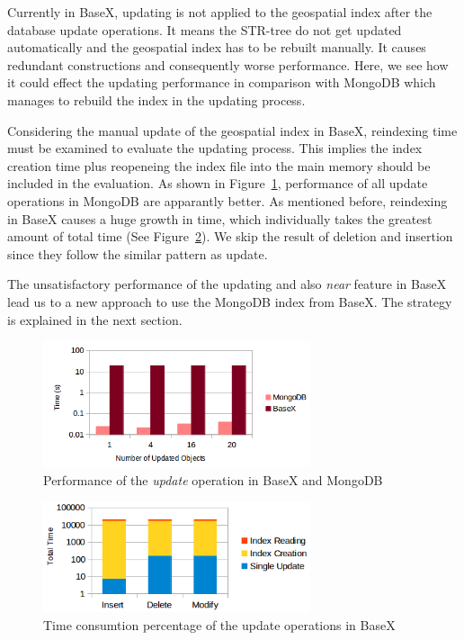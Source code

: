 \documentclass[a4paper,12pt]{article}
\begin{document}
Currently in BaseX, updating is not applied to the geospatial index after the database update operations. It means the STR-tree do not get updated automatically and the geospatial index has to be rebuilt manually. It causes redundant constructions and consequently worse performance. Here, we see how it could effect the updating performance in comparison with MongoDB which manages to rebuild the index in the updating process.

Considering the manual update of the geospatial index in BaseX, reindexing time must be examined to evaluate the updating process. This implies the index creation time plus reopeneing the index file into the main memory should be included in the evaluation. 
As shown in Figure~\ref{figBXvsMongoUpdate}, performance of all update operations in MongoDB are apparantly better. As mentioned before, reindexing in BaseX causes a huge growth in time, which individually takes the greatest amount of total time (See Figure~\ref{figBXUpdate}). We skip the result of deletion and insertion since they follow the similar pattern as update.

The unsatisfactory performance of the updating and also \textit{near} feature in BaseX lead us to a new approach to use the MongoDB index from BaseX. The strategy is explained in the next section.

 


\begin{figure}
\centering
\includegraphics[width=0.7\textwidth]{BXvsMongo-Update-sec.png}
\caption{Performance of the \textit{update} operation in BaseX and MongoDB}
\label{figBXvsMongoUpdate}
\end{figure}


\begin{figure}
\centering
\includegraphics[width=0.7\textwidth]{BXUpdate.png}
\caption{Time consumtion percentage of the update operations in BaseX}
\label{figBXUpdate}
\end{figure}
\end{document}
